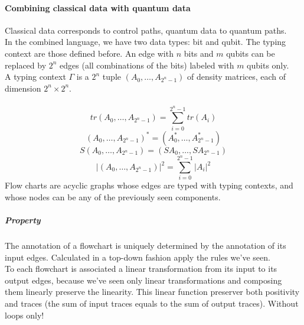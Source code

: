 \documentclass[10pt]{report}
\begin{document}
\paragraph{Combining classical data with quantum data} Classical data corresponds to control paths, quantum data to quantum paths.\\
In the combined language, we have two data types: bit and qubit. The typing context are those defined before. An edge with $n$ bits and $m$ qubits can be replaced by $2^n$ edges (all combinations of the bits) labeled with $m$ qubits only.\\
A typing context $\Gamma$ is a $2^n$ tuple $(A_0,\ldots, A_{2^n-1})$ of density matrices, each of dimension $2^n\times 2^n$.\\\\
$$tr(A_0,\ldots,A_{2^n-1}) = \sum_{i=0}^{2^n-1} tr(A_i)$$
$$(A_0,\ldots,A_{2^n-1})^* = (A_0^*,\ldots,A_{2^n-1}^*)$$
$$S(A_0,\ldots,A_{2^n-1}) = (SA_0,\ldots,SA_{2^n-1})$$
$$|(A_0,\ldots,A_{2^n-1})|^2 = \sum_{i=0}^{2^n-1} |A_i|^2$$
Flow charts are acyclic graphs whose edges are typed with typing contexts, and whose nodes can be any of the previously seen components.
\subparagraph{Property} The annotation of a flowchart is uniquely determined by the annotation of its input edges. Calculated in a top-down fashion apply the rules we've seen.\\
To each flowchart is associated a linear transformation from its input to its output edges, because we've seen only linear transformations and composing them linearly preserve the linearity. This linear function preserver both positivity and traces (the sum of input traces equals to the sum of output traces). Without loops only!
\end{document}
